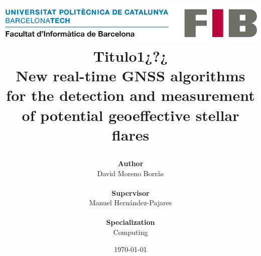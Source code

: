 \title{
	{
	\includegraphics[width=0.7\linewidth]{images/cover/logo-fib.png}	
	\vspace{1cm} \\
	\textbf{Titulo1¿?¿} \\
	\large New real-time GNSS algorithms for the detection and measurement of potential geoeffective stellar flares}
\author{\textbf{Author}\\
	David Moreno Borr\`as
	\\ \\
	\textbf{Supervisor}\\
	Manuel Hernández-Pajares
	\\ \\
	\textbf{Specialization}\\
	Computing
} 
	\vspace{1.3cm}
\date{\today}
}
\maketitle
\thispagestyle{empty}